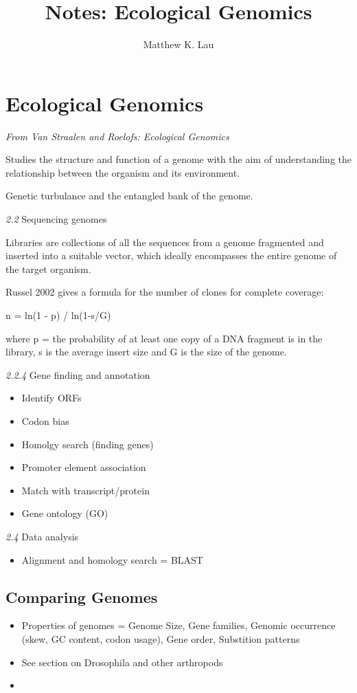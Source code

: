 \documentclass[9pt,twocolumn,twoside]{pnas-new}
\title{Notes: Ecological Genomics}
\author[a,1]{Matthew K. Lau}
\affil[a]{Harvard Forest, Harvard University, Petersham, MA 01366}
\begin{document}
\section{Ecological Genomics}

\textit{From Van Straalen and Roelofs: Ecological Genomics}

Studies the structure and function of a genome with the aim of understanding the relationship between the organism and its environment.

Genetic turbulance and the entangled bank of the genome.

\textit{2.2} Sequencing genomes

Libraries are collections of all the sequences from a genome fragmented and inserted into a suitable vector, which ideally encompasses the entire genome of the target organism. 

Russel 2002 gives a formula for the number of clones for complete coverage:

n = ln(1 - p) / ln(1-s/G) 

where p = the probability of at least one copy of a DNA fragment is in the library, s is the average insert size and G is the size of the genome. 


\textit{2.2.4} Gene finding and annotation

\begin{itemize}
\item Identify ORFs
\item Codon bias
\item Homolgy search (finding genes)
\item Promoter element association
\item Match with transcript/protein
\item Gene ontology (GO)
\end{itemize}

\textit{2.4} Data analysis

\begin{itemize}
\item Alignment and homology search = BLAST
\end{itemize}

\subsection{Comparing Genomes}

\begin{itemize}
\item Properties of genomes = Genome Size, Gene families, Genomic occurrence (skew, GC content, codon usage), Gene order, Substition patterns
\item See section on Drosophila and other arthropods
\item 
\end{itemize}
\end{document}
